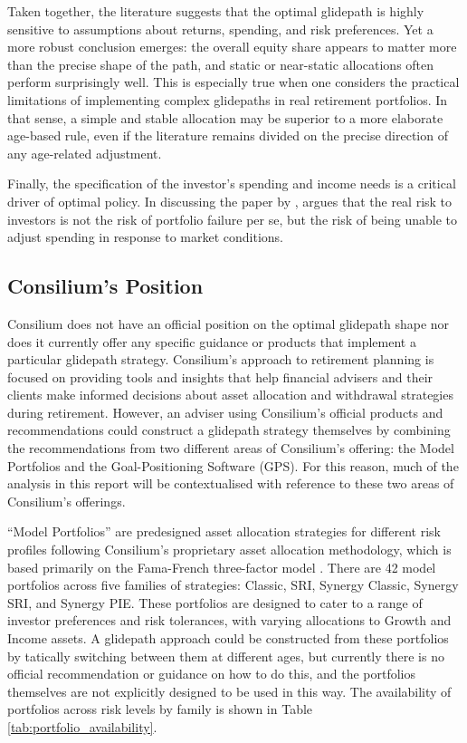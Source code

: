 \documentclass[11pt]{article}
\begin{document}
Taken together, the literature suggests that the optimal glidepath is highly sensitive to assumptions about returns, spending, and risk preferences. Yet a more robust conclusion emerges: the overall equity share appears to matter more than the precise shape of the path, and static or near-static allocations often perform surprisingly well. This is especially true when one considers the practical limitations of implementing complex glidepaths in real retirement portfolios. In that sense, a simple and stable allocation may be superior to a more elaborate age-based rule, even if the literature remains divided on the precise direction of any age-related adjustment.

Finally, the specification of the investor's spending and income needs is a critical driver of optimal policy. In discussing the paper by \textcite{anarkulova2025beyond}, \textcite{felix2025controversial} argues that the real risk to investors is not the risk of portfolio failure per se, but the risk of being unable to adjust spending in response to market conditions. 


\subsection{Consilium's Position}

Consilium does not have an official position on the optimal glidepath shape nor does it currently offer any specific guidance or products that implement a particular glidepath strategy. Consilium's approach to retirement planning is focused on providing tools and insights that help financial advisers and their clients make informed decisions about asset allocation and withdrawal strategies during retirement. However, an adviser using Consilium's official products and recommendations could construct a glidepath strategy themselves by combining the recommendations from two different areas of Consilium's offering: the Model Portfolios and the Goal-Positioning Software (GPS). For this reason, much of the analysis in this report will be contextualised with reference to these two areas of Consilium's offerings. 

``Model Portfolios'' are predesigned asset allocation strategies for different risk profiles following Consilium's proprietary asset allocation methodology, which is based primarily on the Fama-French three-factor model \parencite{fama1993common}. There are 42 model portfolios across five families of strategies: Classic, SRI, Synergy Classic, Synergy SRI, and Synergy PIE. These portfolios are designed to cater to a range of investor preferences and risk tolerances, with varying allocations to Growth and Income assets. A glidepath approach could be constructed from these portfolios by tatically switching between them at different ages, but currently there is no official recommendation or guidance on how to do this, and the portfolios themselves are not explicitly designed to be used in this way. The availability of portfolios across risk levels by family is shown in Table \ref{tab:portfolio_availability}.
\end{document}
